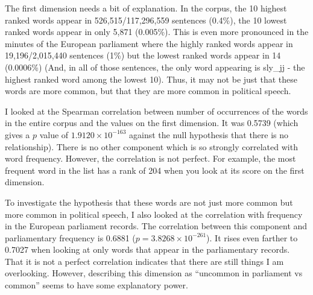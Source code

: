 The first dimension needs a bit of explanation. In the corpus, the 10 highest 
ranked words appear in 526,515/117,296,559 sentences (0.4\%), the 10 lowest 
ranked words appear in only 5,871 (0.005\%). This is even more pronounced in the 
minutes of the European parliament where the highly ranked words appear in 
19,196/2,015,440 sentences (1\%) but the lowest ranked words appear in 14 
(0.0006\%) (And, in all of those sentences, the only word appearing is 
sly\_jj - the highest ranked word among the lowest 10). Thus, it may not be 
just that these words are more common, but that they are more common in 
political speech.

I looked at the Spearman correlation between number of occurrences of the words 
in the entire corpus and the values on the first dimension. It was 0.5739 
(which gives a $p$ value of $1.9120 \times 10^{-163}$ against the null hypothesis 
that there is no relationship). There is no other component which is so 
strongly correlated with word frequency. However, the correlation is not 
perfect. For example, the most frequent word in the list has a rank of 204 when 
you look at its score on the first dimension.

To investigate the hypothesis that these words are not just more common but 
more common in political speech, I also looked at the correlation with 
frequency in the European parliament records. The correlation between this 
component and parliamentary frequency is 0.6881 
($p=3.8268 \times 10^{-261}$).  It rises even farther to 0.7027 when looking 
at only words that appear in the 
parliamentary records. That it is not a perfect correlation indicates that 
there are still things I am overlooking. However, describing this dimension as 
``uncommon in parliament vs common'' seems to have some explanatory power.

